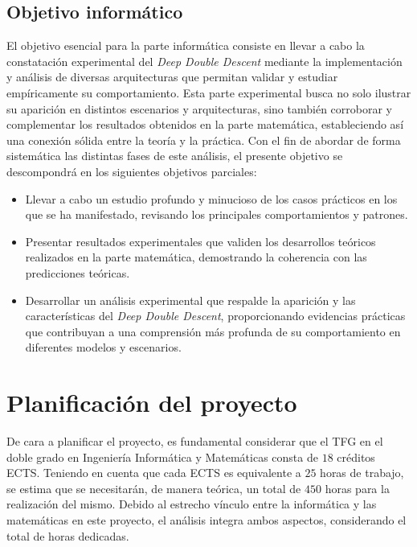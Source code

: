 \subsection{Objetivo informático}

El objetivo esencial para la parte informática consiste en llevar a cabo la constatación experimental del \textit{Deep Double Descent} mediante la implementación y análisis de diversas arquitecturas que permitan validar y estudiar empíricamente su comportamiento. Esta parte experimental busca no solo ilustrar su aparición en distintos escenarios y arquitecturas, sino también corroborar y complementar los resultados obtenidos en la parte matemática, estableciendo así una conexión sólida entre la teoría y la práctica. Con el fin de abordar de forma sistemática las distintas fases de este análisis, el presente objetivo se descompondrá en los siguientes objetivos parciales:

\begin{itemize}
    \item Llevar a cabo un estudio profundo y minucioso de los casos prácticos en los que se ha manifestado, revisando los principales comportamientos y patrones.
    \item Presentar resultados experimentales que validen los desarrollos teóricos realizados en la parte matemática, demostrando la coherencia con las predicciones teóricas.
    \item Desarrollar un análisis experimental que respalde la aparición y las características del \textit{Deep Double Descent}, proporcionando evidencias prácticas que contribuyan a una comprensión más profunda de su comportamiento en diferentes modelos y escenarios.\newline
\end{itemize}

\section{Planificación del proyecto}

De cara a planificar el proyecto, es fundamental considerar que el TFG en el doble grado en Ingeniería Informática y Matemáticas consta de $18$ créditos ECTS. Teniendo en cuenta que cada ECTS es equivalente a $25$ horas de trabajo, se estima que se necesitarán, de manera teórica, un total de $450$ horas para la realización del mismo. Debido al estrecho vínculo entre la informática y las matemáticas en este proyecto, el análisis integra ambos aspectos, considerando el total de horas dedicadas.\newline

